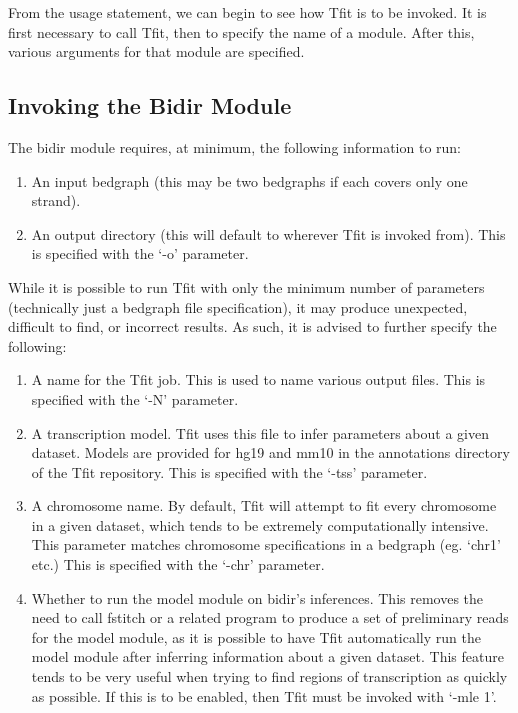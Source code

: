 \documentclass[12pt,letterpaper]{article}
\begin{document}
From the usage statement, we can begin to see how Tfit is to be invoked. It is first necessary to call Tfit, then to specify the name of a module. After this, various arguments for that module are specified.

\subsection{Invoking the Bidir Module}
The bidir module requires, at minimum, the following information to run:
\begin{enumerate}
\item An input bedgraph (this may be two bedgraphs if each covers only one strand).
\item An output directory (this will default to wherever Tfit is invoked from). This is specified with the `-o' parameter.
\end{enumerate}

While it is possible to run Tfit with only the minimum number of parameters (technically just a bedgraph file specification), it may produce unexpected, difficult to find, or incorrect results. As such, it is advised to further specify the following:

\begin{enumerate}
\item A name for the Tfit job. This is used to name various output files. This is specified with the `-N' parameter.
\item A transcription model. Tfit uses this file to infer parameters about a given dataset. Models are provided for hg19 and mm10 in the annotations directory of the Tfit repository. This is specified with the `-tss' parameter.
\item A chromosome name. By default, Tfit will attempt to fit every chromosome in a given dataset, which tends to be extremely computationally intensive. This parameter matches chromosome specifications in a bedgraph (eg. `chr1' etc.) This is specified with the `-chr' parameter.
\item Whether to run the model module on bidir's inferences. This removes the need to call fstitch or a related program to produce a set of preliminary reads for the model module, as it is possible to have Tfit automatically run the model module after inferring information about a given dataset. This feature tends to be very useful when trying to find regions of transcription as quickly as possible. If this is to be enabled, then Tfit must be invoked with `-mle 1'.
\end{enumerate}
\end{document}
